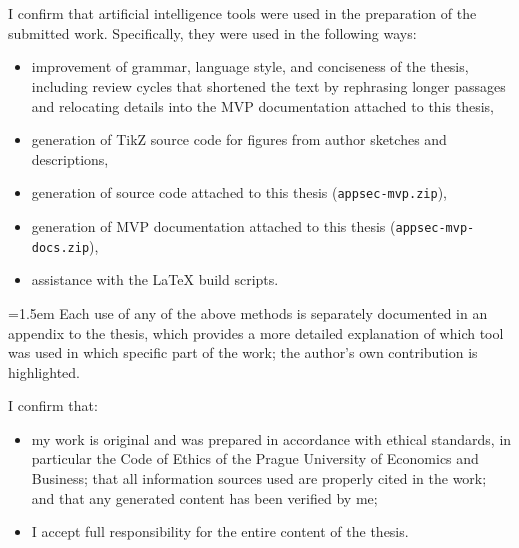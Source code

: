 \hypersetup{pageanchor=true}
\cleardoublepage
\pagestyle{plain}
\openright
\vspace*{\fill}
\section*{\ProhlaseniAIText}
\noindent

I confirm that artificial intelligence tools were used in the preparation of
the submitted work. Specifically, they were used in the following ways:

\begin{itemize}
\item improvement of grammar, language style, and conciseness of the thesis, including review cycles that shortened the text by rephrasing longer passages and relocating details into the MVP documentation attached to this thesis,
\item generation of TikZ source code for figures from author sketches and descriptions,
\item generation of source code attached to this thesis (\texttt{appsec-mvp.zip}),
\item generation of MVP documentation attached to this thesis (\texttt{appsec-mvp-docs.zip}),
\item assistance with the \LaTeX{} build scripts.
\end{itemize}

{\leftskip=1.5em
Each use of any of the above methods is separately documented in an appendix to
the thesis, which provides a more detailed explanation of which tool was used in
which specific part of the work; the author's own contribution is highlighted.

I confirm that:
\begin{itemize}
\item my work is original and was prepared in accordance with ethical standards, in particular the Code of Ethics of the Prague University of Economics and Business; that all information sources used are properly cited in the work; and that any generated content has been verified by me;
\item I accept full responsibility for the entire content of the thesis.
\end{itemize}
}

\vspace{1cm}
